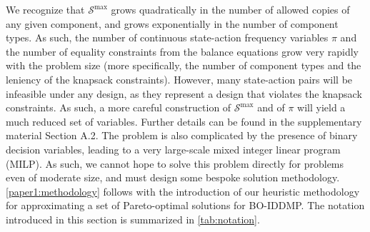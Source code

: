 \documentclass[11pt,authoryear,a4paper]{article}
\theoremstyle{definition}
\begin{document}
We recognize that $\mathcal{S}^{\max}$ grows quadratically in the number of allowed copies of any given component, and grows exponentially in the number of component types. As such, the number of continuous state-action frequency variables $\pi$ and the number of equality constraints from the balance equations grow very rapidly with the problem size (more specifically, the number of component types and the leniency of the knapsack constraints). {However, many state-action pairs will be infeasible under any design, as they represent a design that violates the knapsack constraints. As such, a more careful construction of $\mathcal{S}^{\max}$ and of $\pi$ will yield a much reduced set of variables. Further details can be found in the supplementary material Section A.2.} The problem is also complicated by the presence of binary decision variables, leading to a very large-scale mixed integer linear program (MILP). As such, we cannot hope to solve this problem directly for problems even of moderate size, and must design some bespoke solution methodology. \autoref{paper1:methodology} follows with the introduction of our heuristic methodology for approximating a set of Pareto-optimal solutions for BO-IDDMP. 
The notation introduced in this section is summarized in \autoref{tab:notation}.
\end{document}

